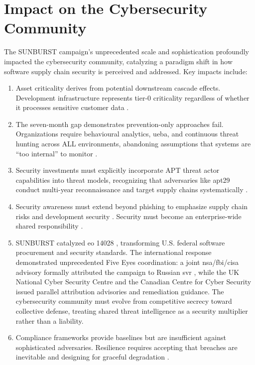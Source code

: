 \section{Impact on the Cybersecurity Community}
\label{sec:community_impact}

The SUNBURST campaign's unprecedented scale and sophistication profoundly impacted the cybersecurity community, catalyzing a paradigm shift in how software supply chain security is perceived and addressed. Key impacts include:

\begin{enumerate}
    \item {} Asset criticality derives from potential downstream cascade effects. Development infrastructure represents tier-0 criticality regardless of whether it processes sensitive customer data \cite{boyens_cybersecurity_2022}.
    \item {} The seven-month gap demonstrates prevention-only approaches fail. Organizations require behavioural analytics, \gls{ueba}, and continuous threat hunting across ALL environments, abandoning assumptions that systems are ``too internal'' to monitor \cite{nelson_incident_2025}.
    \item {} Security investments must explicitly incorporate APT threat actor capabilities into threat models, recognizing that adversaries like \gls{apt}29 conduct multi-year reconnaissance and target supply chains systematically \cite{mitre_apt29_2025}.
    \item {} Security awareness must extend beyond phishing to emphasize supply chain risks and development security \cite{boyens_cybersecurity_2022}. Security must become an enterprise-wide shared responsibility \cite{pascoe_nist_2024}.
    \item {} SUNBURST catalyzed \gls{eo} 14028 \cite{us_eo_2021}, transforming U.S. federal software procurement and security standards. The international response demonstrated unprecedented Five Eyes coordination: a joint \gls{nsa}/\gls{fbi}/\gls{cisa} advisory formally attributed the campaign to Russian \gls{svr} \cite{agency_russian_2021}, while the UK National Cyber Security Centre \cite{ncsc_uk_2021} and the Canadian Centre for Cyber Security \cite{cccs_recommendations_2020} issued parallel attribution advisories and remediation guidance. The cybersecurity community must evolve from competitive secrecy toward collective defense, treating shared threat intelligence as a security multiplier rather than a liability.
    \item {} Compliance frameworks provide baselines but are insufficient against sophisticated adversaries. Resilience requires accepting that breaches are inevitable and designing for graceful degradation \cite{nelson_incident_2025}.
\end{enumerate}
